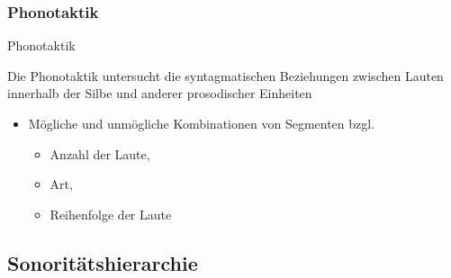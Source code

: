 \begin{frame}
\frametitle{Phonotaktik}

\begin{block}{Phonotaktik}

Die Phonotaktik untersucht die syntagmatischen Beziehungen zwischen Lauten innerhalb der Silbe und anderer prosodischer Einheiten \citep{Fuhrhop&Co13a}

\end{block}

\begin{itemize}
	\item Mögliche und unmögliche Kombinationen von Segmenten bzgl.
	
	\begin{itemize}
		\item Anzahl der Laute,
		\item Art,
		\item Reihenfolge der Laute
	\end{itemize}

\end{itemize}

\end{frame}



\subsection{Sonoritätshierarchie}

